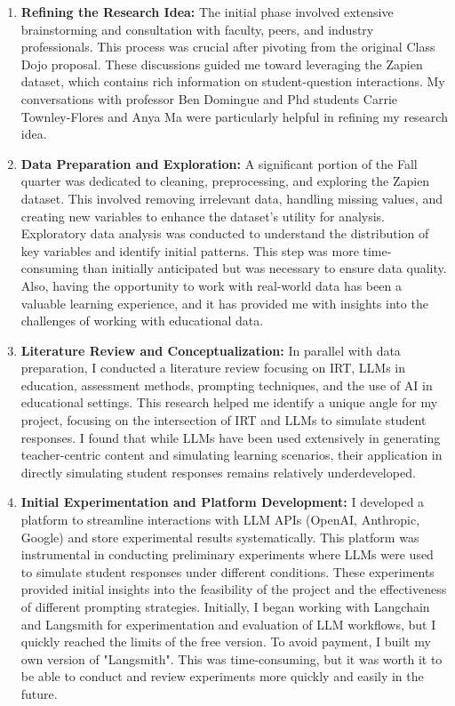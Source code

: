 \documentclass[12pt, letterpaper]{article}
\begin{document}
\begin{enumerate}
    \item \textbf{Refining the Research Idea:} The initial phase involved extensive brainstorming and consultation with faculty, peers, and industry professionals. This process was crucial after pivoting from the original Class Dojo proposal. These discussions guided me toward leveraging the Zapien dataset, which contains rich information on student-question interactions. My conversations with professor Ben Domingue and Phd students Carrie Townley-Flores and Anya Ma were particularly helpful in refining my research idea.
    
    \item \textbf{Data Preparation and Exploration:} A significant portion of the Fall quarter was dedicated to cleaning, preprocessing, and exploring the Zapien dataset. This involved removing irrelevant data, handling missing values, and creating new variables to enhance the dataset's utility for analysis. Exploratory data analysis was conducted to understand the distribution of key variables and identify initial patterns. This step was more time-consuming than initially anticipated but was necessary to ensure data quality. Also, having the opportunity to work with real-world data has been a valuable learning experience, and it has provided me with insights into the challenges of working with educational data.
    
    \item \textbf{Literature Review and Conceptualization:} In parallel with data preparation, I conducted a literature review focusing on IRT, LLMs in education, assessment methods, prompting techniques, and the use of AI in educational settings. This research helped me identify a unique angle for my project, focusing on the intersection of IRT and LLMs to simulate student responses. I found that while LLMs have been used extensively in generating teacher-centric content and simulating learning scenarios, their application in directly simulating student responses remains relatively underdeveloped.
    
    \item \textbf{Initial Experimentation and Platform Development:} I developed a platform to streamline interactions with LLM APIs (OpenAI, Anthropic, Google) and store experimental results systematically. This platform was instrumental in conducting preliminary experiments where LLMs were used to simulate student responses under different conditions. These experiments provided initial insights into the feasibility of the project and the effectiveness of different prompting strategies. Initially, I began working with Langchain and Langsmith for experimentation and evaluation of LLM workflows, but I quickly reached the limits of the free version. To avoid payment, I built my own version of "Langsmith". This was time-consuming, but it was worth it to be able to conduct and review experiments more quickly and easily in the future.
    

\end{enumerate}
\end{document}
